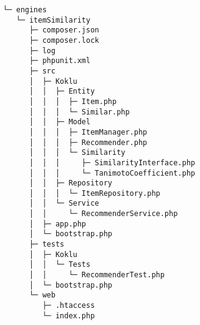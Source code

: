 \begin{codebox}
\begin{verbatim}
└─ engines
   └─ itemSimilarity
      ├─ composer.json
      ├─ composer.lock
      ├─ log
      ├─ phpunit.xml
      ├─ src
      │  ├─ Koklu
      │  │  ├─ Entity
      │  │  │  ├─ Item.php
      │  │  │  └─ Similar.php
      │  │  ├─ Model
      │  │  │  ├─ ItemManager.php
      │  │  │  ├─ Recommender.php
      │  │  │  └─ Similarity
      │  │  │     ├─ SimilarityInterface.php
      │  │  │     └─ TanimotoCoefficient.php
      │  │  ├─ Repository
      │  │  │  └─ ItemRepository.php
      │  │  └─ Service
      │  │     └─ RecommenderService.php
      │  ├─ app.php
      │  └─ bootstrap.php
      ├─ tests
      │  ├─ Koklu
      │  │  └─ Tests
      │  │     └─ RecommenderTest.php
      │  └─ bootstrap.php
      └─ web
         ├─ .htaccess
         └─ index.php

\end{verbatim}
\end{codebox}

